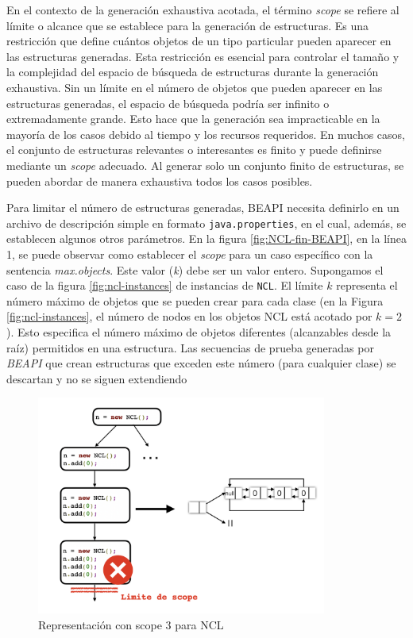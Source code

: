 En el contexto de la generación exhaustiva acotada, el término \emph{scope} se refiere al límite o alcance que se establece para la generación de estructuras. Es una restricción que define cuántos objetos de un tipo particular pueden aparecer en las estructuras generadas. Esta restricción es esencial para controlar el tamaño y la complejidad del espacio de búsqueda de estructuras durante la generación exhaustiva. Sin un límite en el número de objetos que pueden aparecer en las estructuras generadas, el espacio de búsqueda podría ser infinito o extremadamente grande. Esto hace que la generación sea impracticable en la mayoría de los casos debido al tiempo y los recursos requeridos.  En muchos casos, el conjunto de estructuras relevantes o interesantes es finito y puede definirse mediante un \emph{scope} adecuado. Al generar solo un conjunto finito de estructuras, se pueden abordar de manera exhaustiva todos los casos posibles.

Para limitar el número de estructuras generadas, BEAPI necesita definirlo en un archivo de descripción simple en formato \texttt{java.properties}, en el cual, además, se establecen algunos otros parámetros. En la figura \ref{fig:NCL-fin-BEAPI}, en la línea 1, se puede observar como establecer el \emph{scope} para un caso específico con la sentencia \emph{max.objects}. Este valor (\emph{k}) debe ser un valor entero. Supongamos el caso de la figura \ref{fig:ncl-instances} de instancias de \texttt{NCL}.  El límite $k$ representa el número máximo de objetos que se pueden crear para cada clase (en la Figura \ref{fig:ncl-instances}, el número de nodos en los objetos NCL está acotado por $k=2$). Esto especifica el número máximo de objetos diferentes (alcanzables desde la raíz) permitidos en una estructura. Las secuencias de prueba generadas por \emph{BEAPI} que crean estructuras que exceden este número (para cualquier clase) se descartan y no se siguen extendiendo

\begin{figure}[H]
    \centering
    \includegraphics[width=0.85\textwidth]{images/scope.jpg}
    \caption{Representación con scope 3 para NCL}
    \label{fig:scope}
\end{figure}

